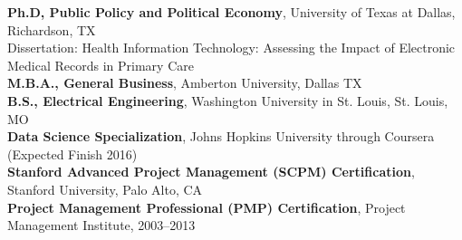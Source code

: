 \documentclass{article}
\begin{document}
\noindent
{\bfseries Ph.D, Public Policy and Political Economy}, University of Texas at Dallas, Richardson, TX \\
Dissertation: Health Information Technology: Assessing the Impact of Electronic Medical Records in Primary Care \\
{\bfseries M.B.A., General Business}, Amberton University, Dallas TX \\
{\bfseries B.S., Electrical Engineering}, Washington University in St. Louis, St. Louis, MO \\
{\bfseries Data Science Specialization}, Johns Hopkins University through Coursera (Expected Finish 2016) \\
{\bfseries Stanford Advanced Project Management (SCPM) Certification}, Stanford University, Palo Alto, CA \\
{\bfseries Project Management Professional (PMP) Certification}, Project Management Institute, 2003--2013
\end{document}
